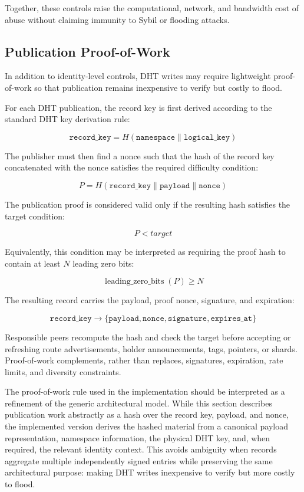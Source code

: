 \documentclass[
  12pt,
  oneside,
  a4paper,
  chapter=TITLE,
  section=TITLE,
  english,
  brazil
]{abntex2}
\begin{document}
Together, these controls raise the computational, network, and bandwidth cost of
abuse without claiming immunity to Sybil or flooding attacks.

\subsection{Publication Proof-of-Work}

In addition to identity-level controls, DHT writes may require lightweight
proof-of-work so that publication remains inexpensive to verify but costly to flood.

For each DHT publication, the record key is first derived according to the standard
DHT key derivation rule:

\[
\texttt{record\_key} = H(\texttt{namespace} \parallel \texttt{logical\_key})
\]

The publisher must then find a nonce such that the hash of the record key
concatenated with the nonce satisfies the required difficulty condition:

\[
P = H(\texttt{record\_key} \parallel \texttt{payload} \parallel \texttt{nonce})
\]

The publication proof is considered valid only if the resulting hash satisfies the
target condition:

\[
P < target
\]

Equivalently, this condition may be interpreted as requiring the proof hash to
contain at least \(N\) leading zero bits:

\[
\operatorname{leading\_zero\_bits}(P) \geq N
\]

The resulting record carries the payload, proof nonce, signature, and expiration:

\[
\texttt{record\_key} \rightarrow
\{
\texttt{payload},
\texttt{nonce},
\texttt{signature},
\texttt{expires\_at}
\}
\]

Responsible peers recompute the hash and check the target before accepting or
refreshing route advertisements, holder announcements, tags, pointers, or shards.
Proof-of-work complements, rather than replaces, signatures, expiration, rate
limits, and diversity constraints.

The proof-of-work rule used in the implementation should be interpreted as a refinement of the generic architectural model. While this section describes publication work abstractly as a hash over the record key, payload, and nonce, the implemented version derives the hashed material from a canonical payload representation, namespace information, the physical DHT key, and, when required, the relevant identity context. This avoids ambiguity when records aggregate multiple independently signed entries while preserving the same architectural purpose: making DHT writes inexpensive to verify but more costly to flood.
\end{document}
